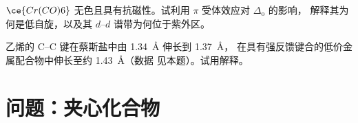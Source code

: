 \begin{exercise}[$\star\star\star$]\label{exo:b3:organometallic-bonding:11}
$\ce{Cr(CO)6}$ 无色且具有抗磁性。试利用 $\pi$ 受体效应对 $\Delta_{\mathrm o}$ 的影响，
解释其为何是低自旋，以及其 $d$--$d$ 谱带为何位于紫外区。
\end{exercise}

\begin{exercise}[$\star\star\star$]\label{exo:b3:organometallic-bonding:12}
乙烯的 C--C 键在蔡斯盐中由 \qty{1.34}{\angstrom} 伸长到 \qty{1.37}{\angstrom}，
在具有强反馈键合的低价金属配合物中伸长至约 \qty{1.43}{\angstrom}（数据
见本题）。试用解释。
\end{exercise}

\section{问题：夹心化合物}

